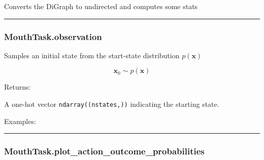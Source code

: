Converts the DiGraph to undirected and computes some stats

\begin{center}\rule{0.5\linewidth}{\linethickness}\end{center}

\subsubsection{MouthTask.observation}\label{mouthtask.observation}

\begin{Shaded}
\begin{Highlighting}[]
\NormalTok{)}
\end{Highlighting}
\end{Shaded}

Samples an initial state from the start-state distribution
\(p(\mathbf x)\)

\[
\mathbf x_0 \sim p(\mathbf x)
\]

Returns:

A one-hot vector \texttt{ndarray((nstates,))} indicating the starting
state.

Examples:

\begin{Shaded}
\begin{Highlighting}[]
\OperatorTok{=}
\end{Highlighting}
\end{Shaded}

\begin{center}\rule{0.5\linewidth}{\linethickness}\end{center}

\subsubsection{MouthTask.plot\_action\_outcome\_probabilities}\label{mouthtask.plot_action_outcome_probabilities}

\begin{Shaded}
\begin{Highlighting}[]
\OperatorTok{=}\OperatorTok{=}\OperatorTok{=}\OperatorTok{=}\NormalTok{)}
\end{Highlighting}
\end{Shaded}


